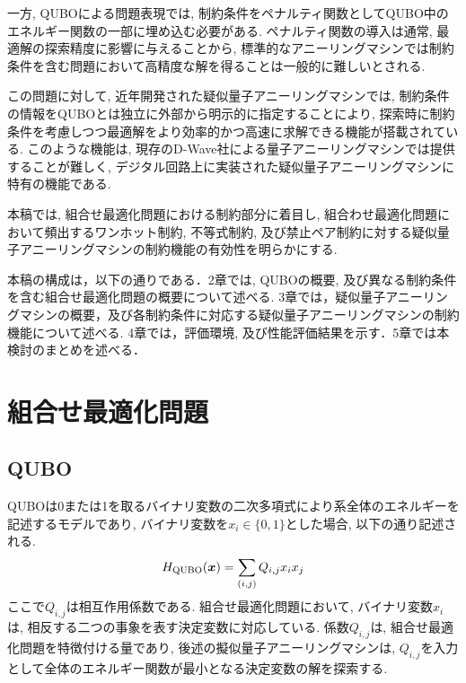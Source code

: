 \documentclass[submit,techrep,noauthor]{ipsj}
\begin{document}
一方, QUBOによる問題表現では, 制約条件をペナルティ関数としてQUBO中のエネルギー関数の一部に埋め込む必要がある. ペナルティ関数の導入は通常, 最適解の探索精度に影響に与えることから, 標準的なアニーリングマシンでは制約条件を含む問題において高精度な解を得ることは一般的に難しいとされる\cite{ozeki, onoda2}.

この問題に対して, 近年開発された疑似量子アニーリングマシンでは, 制約条件の情報をQUBOとは独立に外部から明示的に指定することにより, 探索時に制約条件を考慮しつつ最適解をより効率的かつ高速に求解できる機能が搭載されている\cite{takano, da3}. このような機能は, 現存のD-Wave社による量子アニーリングマシンでは提供することが難しく, デジタル回路上に実装された疑似量子アニーリングマシンに特有の機能である. 

本稿では, 組合せ最適化問題における制約部分に着目し, 組合わせ最適化問題において頻出するワンホット制約, 不等式制約, 及び禁止ペア制約に対する疑似量子アニーリングマシンの制約機能の有効性を明らかにする.

本稿の構成は，以下の通りである．2章では, QUBOの概要, 及び異なる制約条件を含む組合せ最適化問題の概要について述べる. 3章では，疑似量子アニーリングマシンの概要，及び各制約条件に対応する疑似量子アニーリングマシンの制約機能について述べる. 4章では，評価環境, 及び性能評価結果を示す．5章では本検討のまとめを述べる．

\section{組合せ最適化問題}

\subsection{QUBO}
QUBOは0または1を取るバイナリ変数の二次多項式により系全体のエネルギーを記述するモデルであり, バイナリ変数を$x_{i}\in\{0, 1\}$とした場合, 以下の通り記述される.
\begin{equation}
H_{\rm{QUBO}}(\bm{x}) = \sum_{(i,j)} Q_{i,j}x_{i}x_{j}
\label{H_qubo}
\end{equation}
ここで$Q_{i,j}$は相互作用係数である. 組合せ最適化問題において, バイナリ変数$x_{i}$は, 相反する二つの事象を表す決定変数に対応している. 係数$Q_{i,j}$は, 組合せ最適化問題を特徴付ける量であり, 後述の擬似量子アニーリングマシンは, $Q_{i,j}$を入力として全体のエネルギー関数が最小となる決定変数の解を探索する. 
\end{document}
